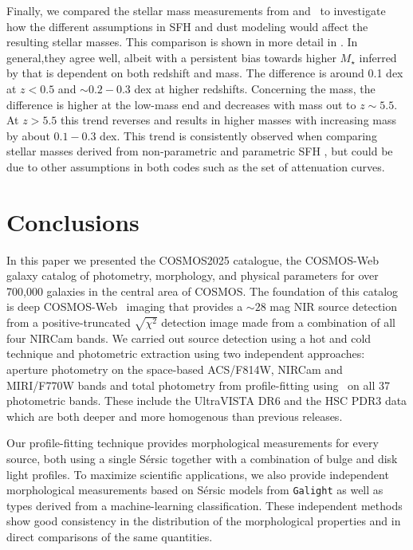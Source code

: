 \documentclass[longauth]{aa}
\begin{document}
Finally, we compared the stellar mass measurements from \lephare{} and \cigale\ to investigate how the different assumptions in SFH and dust modeling would affect the resulting stellar masses. This comparison is shown in more detail in \citet[][Appendix F]{Shuntov2024}. In general,they agree well, albeit with a persistent bias towards higher $M_{\star}$ inferred by \cigale{} that is dependent on both redshift and mass. The difference is around 0.1 dex at $z<0.5$ and $\sim 0.2-0.3$ dex at higher redshifts. Concerning the mass, the difference is higher at the low-mass end and decreases with mass out to $z\sim 5.5$. At $z>5.5$ this trend reverses and \cigale results in higher masses with increasing \lephare{} mass by about $0.1-0.3$ dex. This trend is consistently observed when comparing stellar masses derived from non-parametric and parametric SFH \citep[e.g.,][]{Leja2020}, but could be due to other assumptions in both codes such as the set of attenuation curves.


\section{Conclusions} \label{sec:conclusions}

In this paper we presented the COSMOS2025 catalogue, the COSMOS-Web galaxy catalog of photometry, morphology, and physical parameters for over 700,000 galaxies in the central area of COSMOS. The foundation of this catalog is deep COSMOS-Web \JWST\ imaging that provides a $\sim 28$ mag NIR source detection from a positive-truncated $\sqrt{\chi^2}$ detection image made from a combination of all four NIRCam bands. We carried out source detection using a hot and cold technique and photometric extraction using two independent approaches: aperture photometry on the space-based ACS/F814W, NIRCam and MIRI/F770W bands and total photometry from profile-fitting using \SEpp\ on all 37 photometric bands. These include the UltraVISTA DR6 and the HSC PDR3 data which are both deeper and more homogenous than previous releases. 

Our profile-fitting technique provides morphological measurements for every source, both using a single Sérsic together with a combination of bulge and disk light profiles. To maximize scientific applications, we also provide independent morphological measurements based on Sérsic models from \texttt{Galight} as well as types derived from a machine-learning classification. These independent methods show good consistency in the distribution of the morphological properties and in direct comparisons of the same quantities. 
\end{document}
